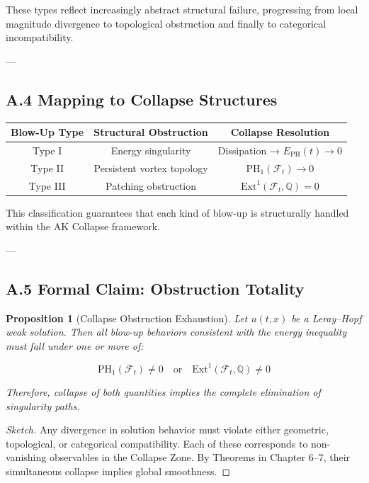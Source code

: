 \documentclass[11pt]{article}
\newtheorem{proposition}[theorem]{Proposition}
\begin{document}
These types reflect increasingly abstract structural failure, progressing from local magnitude divergence to topological obstruction and finally to categorical incompatibility.

---

\subsection*{A.4 Mapping to Collapse Structures}

\begin{center}
\begin{tabular}{|c|c|c|}
\hline
\textbf{Blow-Up Type} & \textbf{Structural Obstruction} & \textbf{Collapse Resolution} \\
\hline
Type I & Energy singularity & Dissipation → \( E_{\mathrm{PH}}(t) \to 0 \) \\
Type II & Persistent vortex topology & \( \mathrm{PH}_1(\mathcal{F}_t) \to 0 \) \\
Type III & Patching obstruction & \( \mathrm{Ext}^1(\mathcal{F}_t, \mathbb{Q}) = 0 \) \\
\hline
\end{tabular}
\end{center}

This classification guarantees that each kind of blow-up is structurally handled within the AK Collapse framework.

---

\subsection*{A.5 Formal Claim: Obstruction Totality}

\begin{proposition}[Collapse Obstruction Exhaustion]
Let \( u(t,x) \) be a Leray–Hopf weak solution.  
Then all blow-up behaviors consistent with the energy inequality must fall under one or more of:

\[
\mathrm{PH}_1(\mathcal{F}_t) \ne 0
\quad \text{or} \quad
\mathrm{Ext}^1(\mathcal{F}_t, \mathbb{Q}) \ne 0
\]

Therefore, collapse of both quantities implies the complete elimination of singularity paths.
\end{proposition}

\begin{proof}[Sketch]
Any divergence in solution behavior must violate either geometric, topological, or categorical compatibility.  
Each of these corresponds to non-vanishing observables in the Collapse Zone.  
By Theorems in Chapter 6–7, their simultaneous collapse implies global smoothness.
\end{proof}
\end{document}
